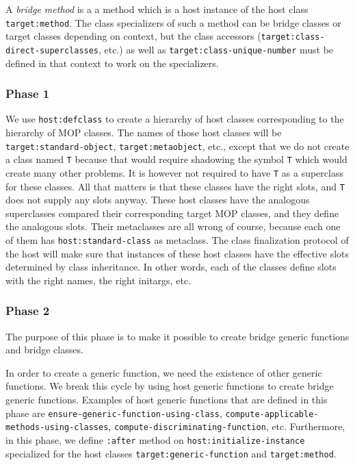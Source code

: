 \begin{definition}
A \emph{bridge method} is a a method which is a host instance of the host
class \texttt{target:method}.  The class specializers of such a method can
be bridge classes or target classes depending on context, but the
class accessors (\texttt{target:class-direct-superclasses}, etc.) as well
as \texttt{target:class-unique-number} must be defined in that context to
work on the specializers. 
\end{definition}

\subsubsection{Phase 1}

We use \texttt{host:defclass} to create a hierarchy of host classes
corresponding to the hierarchy of MOP classes.  The names of those host
classes will be \texttt{target:standard-object},
\texttt{target:metaobject}, etc., except that we do not create a class
named \texttt{T} because that would require shadowing the symbol
\texttt{T} which would create many other problems.  It is however not
required to have \texttt{T} as a superclass for these classes.  All
that matters is that these classes have the right slots, and
\texttt{T} does not supply any slots anyway.  These host classes have
the analogous superclasses compared their corresponding target MOP
classes, and they define the analogous slots.  Their metaclasses are
all wrong of course, because each one of them has
\texttt{host:standard-class} as metaclass.  The class
finalization protocol of the host will make sure that instances of
these host classes have the effective slots determined by class
inheritance.  In other words, each of the classes define slots with
the right names, the right initargs, etc.

\subsubsection{Phase 2}

The purpose of this phase is to make it possible to create bridge
generic functions and bridge classes.

In order to create a generic function, we need the
existence of other generic functions.  We break this cycle by using
host generic functions to create bridge generic functions.  Examples 
of host generic functions that are defined in this phase are
\texttt{ensure-generic-function-using-class},
\texttt{compute-applicable-methods-using-classes},
\texttt{compute-discriminating-function}, etc.  Furthermore, in this
phase, we define \texttt{:after} method on
\texttt{host:initialize-instance} specialized for the host classes
\texttt{target:generic-function} and \texttt{target:method}.  

